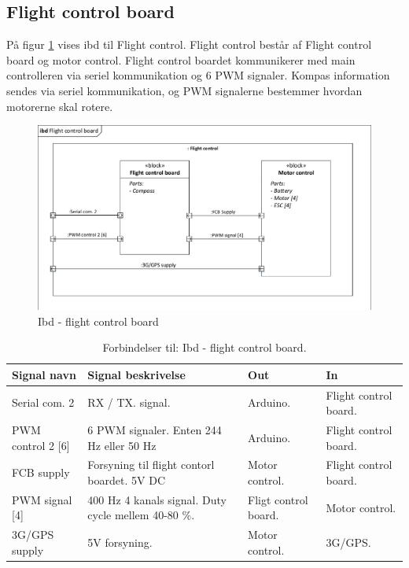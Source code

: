 \subsection{Flight control board}

På figur \ref{fig:ibd_flightcontrolboard} vises ibd til Flight control. Flight control består af Flight control board og motor control. Flight control boardet kommunikerer med main controlleren via seriel kommunikation og 6 PWM signaler. Kompas information sendes via seriel kommunikation, og PWM signalerne bestemmer hvordan motorerne skal rotere. 

\begin{figure}[H]
\centering
\includegraphics[width=1\textwidth]{Billeder/IBD/ibd5_flightcontrolboard.pdf}
\vspace{-0.5cm}
\caption{Ibd - flight control board}
\label{fig:ibd_flightcontrolboard}
\end{figure}

\vspace{0.5cm}

\begin{table}[H]
	\centering
		\begin{tabular}{|p{3.2 cm}|p{5.2 cm}|p{2.4 cm}|p{2.4 cm}|} 
		\hline
			\textbf{Signal navn} 	& \textbf{Signal beskrivelse}		& \textbf{Out} 				& \textbf{In}     \\ \hline
			Serial com. 2 & RX / TX. signal. & Arduino. & Flight control board.			    \\ \hline
			PWM control 2 [6] & 6 PWM signaler. \newline Enten 244 Hz eller 50 Hz & Arduino. & Flight control board.				\\ \hline
			FCB supply &  Forsyning til flight contorl \newline boardet. 5V DC & Motor control. & Flight control board.	\\ \hline
			PWM signal [4] & 400 Hz 4 kanals signal. \newline Duty cycle mellem 40-80 $\%$. & Fligt control board. & Motor control.   \\ \hline 
			3G/GPS supply & 5V forsyning. & Motor control. & 3G/GPS.  \\ \hline 
		\end{tabular}
	\caption{Forbindelser til: Ibd - flight control board. }
	\label{tab:ibd_Flight_control_board}
\end{table}



